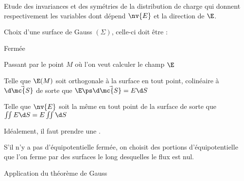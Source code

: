 \documentclass[12pt,fancy]{/Users/victor/Documents/COURS/2ACapECL/texmf/tex/latex/Preambles/cours}
\begin{document}
\begin{enum}
    \item Etude des invariances et des symétries de la distribution de charge qui donnent respectivement les variables dont dépend $\nv{E}$ et la direction de $\E$.
    \item Choix d'une surface de Gauss $(\Sigma)$, celle-ci doit être :
    \begin{liste}
    \item Fermée
    \item Passant par le point $M$ où l'on veut calculer le champ $\E$
    \item Telle que $\E(M)$ soit orthogonale à la surface en tout point, \ie colinéaire à $\d \Vec{\mc{S}}$ de sorte que $\E \ps \d \Vec{\mc{S}} = E \d S$
    \item Telle que $\nv{E}$ soit la même en tout point de la surface de sorte que $\iint E \d S = E \iint \d S$
    
    Idéalement, il faut prendre une .
    \begin{remarque}
    S'il n'y a pas d'équipotentielle fermée, on choisit des portions d'équipotentielle que l'on ferme par des surfaces le long desquelles le flux est nul.
    \end{remarque}
    \item Application du théorème de Gauss 
    \end{liste}
\end{enum}
\end{document}
